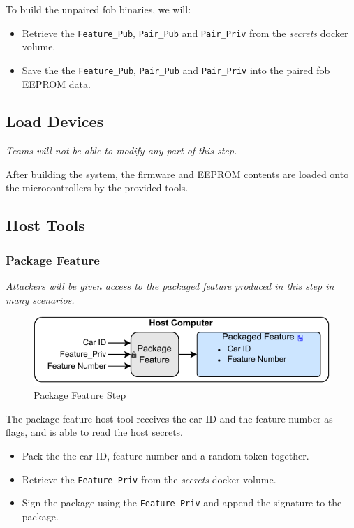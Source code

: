 \documentclass[11pt,oneside,onecolumn,letterpaper]{article}
\begin{document}
To build the unpaired fob binaries, we will:
\begin{itemize}
	\item Retrieve the \verb|Feature_Pub|, \verb|Pair_Pub| and \verb|Pair_Priv| from the \textit{secrets} docker volume.
	\item Save the the \verb|Feature_Pub|, \verb|Pair_Pub| and \verb|Pair_Priv| into the paired fob EEPROM data.
\end{itemize}

\subsection{Load Devices}

\textit{Teams will not be able to modify any part of this step.}

After building the system, the firmware and EEPROM contents are loaded onto the microcontrollers by the provided tools.

\subsection{Host Tools}

\subsubsection{Package Feature}

\textit{Attackers will be given access to the packaged feature produced in this step in many scenarios.}

\begin{figure}[!htbp]
	\begin{centering}
		\includegraphics[width = .6\textwidth]{pic/package_feature.pdf}
		\caption{Package Feature Step}
		\label{fig:package_feature}
	\end{centering}
\end{figure}

The package feature host tool receives the car ID and the feature number as flags, and is able to read the host secrets.
\begin{itemize}
	\item Pack the the car ID, feature number and a random token together.
	\item Retrieve the \verb|Feature_Priv| from the \textit{secrets} docker volume.
	\item Sign the package using the \verb|Feature_Priv| and append the signature to the package.
\end{itemize}
\end{document}
